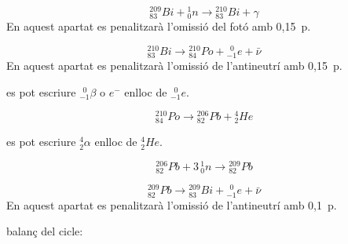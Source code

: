 \begin{solapartat}
 \[ {}^{209}_{83}Bi + {}^{1}_{0}n \to {}^{210}_{83}Bi + \gamma \]
En aquest apartat es penalitzarà l'omissió del fotó amb 0,15~p.

 \[ {}^{210}_{83}Bi \to {}^{210}_{84}Po + {}^{\;\,0}_{-1}e + \bar{\nu} \]
En aquest apartat es penalitzarà l'omissió de l'antineutrí amb 0,15~p.

 es pot escriure ${}^{\;\,0}_{-1}\beta$ o $e^-$ enlloc de ${}^{\;\,0}_{-1}e$.

 \[ {}^{210}_{84}Po \to {}^{206}_{82}Pb + {}^{4}_{2}He \]

 es pot escriure ${}^{4}_{2}\alpha$ enlloc de ${}^{4}_{2}He$.
\end{solapartat}

\begin{solapartat}
 \[ {}^{206}_{82}Pb + 3\,{}^{1}_{0}n \to {}^{209}_{82}Pb \]

 \[ {}^{209}_{82}Pb \to {}^{209}_{83}Bi + {}^{\;\,0}_{-1}e + \bar{\nu} \]
En aquest apartat es penalitzarà l'omissió de l'antineutrí amb 0,1~p.

 balanç del cicle:

\end{solapartat}
